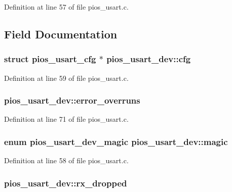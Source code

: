 Definition at line 57 of file pios\-\_\-usart.\-c.



\subsection{Field Documentation}
\hypertarget{structpios__usart__dev_a33767fade40ae8e9eca5f70ee46ab5e0}{
\subsubsection[{cfg}]{\setlength{\rightskip}{0pt plus 5cm}struct {\bf pios\-\_\-usart\-\_\-cfg} $\ast$ pios\-\_\-usart\-\_\-dev\-::cfg}}\label{structpios__usart__dev_a33767fade40ae8e9eca5f70ee46ab5e0}


Definition at line 59 of file pios\-\_\-usart.\-c.

\hypertarget{structpios__usart__dev_a39136a16dedc7d092749a2c36ef899c5}{
\subsubsection[{error\-\_\-overruns}]{ pios\-\_\-usart\-\_\-dev\-::error\-\_\-overruns}}\label{structpios__usart__dev_a39136a16dedc7d092749a2c36ef899c5}


Definition at line 71 of file pios\-\_\-usart.\-c.

\hypertarget{structpios__usart__dev_a687addd5d60a08b8e9f1387f3c82e8a8}{
\subsubsection[{magic}]{\setlength{\rightskip}{0pt plus 5cm}enum {\bf pios\-\_\-usart\-\_\-dev\-\_\-magic} pios\-\_\-usart\-\_\-dev\-::magic}}\label{structpios__usart__dev_a687addd5d60a08b8e9f1387f3c82e8a8}


Definition at line 58 of file pios\-\_\-usart.\-c.

\hypertarget{structpios__usart__dev_afe1832deba4f05c2cb5c33a0f397caa5}{
\subsubsection[{rx\-\_\-dropped}]{ pios\-\_\-usart\-\_\-dev\-::rx\-\_\-dropped}}\label{structpios__usart__dev_afe1832deba4f05c2cb5c33a0f397caa5}



